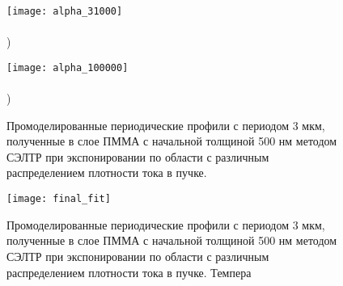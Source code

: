 \documentclass[12pt, letterpaper]{article}
\begin{document}
\begin{figure}[t!]
	\vspace{-3em}
	
	\begin{minipage}{0.48\textwidth}
		\texttt{[image: alpha\_31000]} \\
		\vspace{-13em} \\ ) \\ \vspace{13em}
	\end{minipage}
	\begin{minipage}{0.48\textwidth}
		\texttt{[image: alpha\_100000]} \\
		\vspace{-13em} \\ ) \\ \vspace{13em}
	\end{minipage}

	\vspace{-4em}

	\caption{Промоделированные периодические профили с периодом 3 мкм, полученные в слое ПММА с начальной толщиной 500 нм методом СЭЛТР при экспонировании по области с различным распределением плотности тока в пучке.}
	\label{fig:DEBER_multibeam}
\end{figure}

\begin{figure}
	\begin{center}
		\texttt{[image: final\_fit]}
	\end{center}
	
	\vspace{-2em}
	
	\caption{Промоделированные периодические профили с периодом 3 мкм, полученные в слое ПММА с начальной толщиной 500 нм методом СЭЛТР при экспонировании по области с различным распределением плотности тока в пучке. Темпера}
	\label{fig:DEBER_multibeam}
\end{figure}
\end{document}
